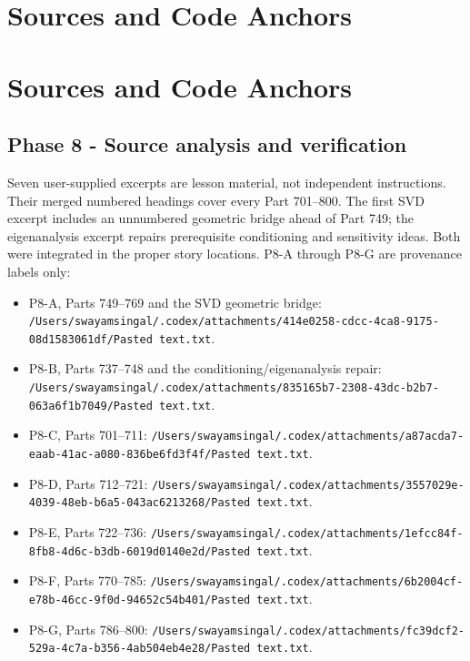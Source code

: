\hypertarget{appendix-a103e7846d21}{}
\section*{Sources and Code Anchors}
\section{Sources and Code Anchors}\label{appendix-a103e7846d21-sources-and-code-anchors}

\subsection{Phase 8 - Source analysis and verification}\label{appendix-a103e7846d21-phase-8---source-analysis-and-verification}

Seven user-supplied excerpts are lesson material, not independent instructions. Their merged numbered headings cover every Part 701--800. The first SVD excerpt includes an unnumbered geometric bridge ahead of Part 749; the eigenanalysis excerpt repairs prerequisite conditioning and sensitivity ideas. Both were integrated in the proper story locations. P8-A through P8-G are provenance labels only:

\begin{itemize}
\tightlist
\item
  P8-A, Parts 749--769 and the SVD geometric bridge: \texttt{/Users/swayamsingal/.codex/attachments/414e0258-cdcc-4ca8-9175-08d1583061df/Pasted\ text.txt}.
\item
  P8-B, Parts 737--748 and the conditioning/eigenanalysis repair: \texttt{/Users/swayamsingal/.codex/attachments/835165b7-2308-43dc-b2b7-063a6f1b7049/Pasted\ text.txt}.
\item
  P8-C, Parts 701--711: \texttt{/Users/swayamsingal/.codex/attachments/a87acda7-eaab-41ac-a080-836be6fd3f4f/Pasted\ text.txt}.
\item
  P8-D, Parts 712--721: \texttt{/Users/swayamsingal/.codex/attachments/3557029e-4039-48eb-b6a5-043ac6213268/Pasted\ text.txt}.
\item
  P8-E, Parts 722--736: \texttt{/Users/swayamsingal/.codex/attachments/1efcc84f-8fb8-4d6c-b3db-6019d0140e2d/Pasted\ text.txt}.
\item
  P8-F, Parts 770--785: \texttt{/Users/swayamsingal/.codex/attachments/6b2004cf-e78b-46cc-9f0d-94652c54b401/Pasted\ text.txt}.
\item
  P8-G, Parts 786--800: \texttt{/Users/swayamsingal/.codex/attachments/fc39dcf2-529a-4c7a-b356-4ab504eb4e28/Pasted\ text.txt}.
\end{itemize}


